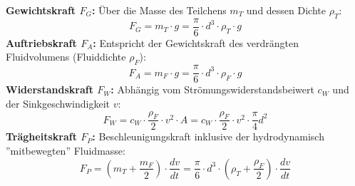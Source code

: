 \documentclass[a4paper,11pt]{article}
\begin{document}
    \textbf{Gewichtskraft $F_G$:} Über die Masse des Teilchens $m_T$ und dessen Dichte $\rho_T$:
    \begin{equation}
        F_G = m_T \cdot g = \frac{\pi}{6} \cdot d^3 \cdot \rho_T \cdot g
    \end{equation}
    \textbf{Auftriebskraft $F_A$:} Entspricht der Gewichtskraft des verdrängten Fluidvolumens (Fluiddichte $\rho_F$):
    \begin{equation}
        F_A = m_F \cdot g = \frac{\pi}{6} \cdot d^3 \cdot \rho_F \cdot g
    \end{equation}
   \textbf{Widerstandskraft $F_W$:} Abhängig vom Strömungswiderstandsbeiwert $c_W$ und der Sinkgeschwindigkeit $v$:
    \begin{equation}
        F_W = c_W \cdot \frac{\rho_F}{2} \cdot v^2 \cdot A = c_W \cdot \frac{\rho_F}{2} \cdot v^2 \cdot \frac{\pi}{4} d^2
    \end{equation}
\textbf{Trägheitskraft $F_P$:} Beschleunigungskraft inklusive der hydrodynamisch ''mitbewegten'' Fluidmasse:
    \begin{equation}
        F_P = \left(m_T + \frac{m_F}{2}\right) \cdot \frac{dv}{dt} = \frac{\pi}{6} \cdot d^3 \cdot \left(\rho_T + \frac{\rho_F}{2}\right) \cdot \frac{dv}{dt}
    \end{equation}

\pagebreak
{}
\end{document}
